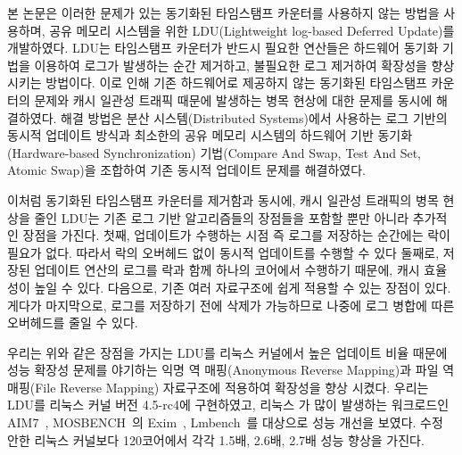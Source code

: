 %
본 논문은 이러한 문제가 있는 동기화된 타임스탬프 카운터를 사용하지 않는 방법을 사용하며,
공유 메모리 시스템을 위한 LDU(Lightweight log-based Deferred Update)를 개발하였다.
LDU는 타임스탬프 카운터가 반드시 필요한 연산들은 하드웨어 동기화 기법을 이용하여 
로그가 발생하는 순간 제거하고, 불필요한 로그 제거하여 확장성을 향상 시키는 방법이다.
이로 인해 기존 하드웨어로 제공하지 않는 동기화된 타임스탬프 카운터의 문제와 
캐시 일관성 트래픽 때문에 발생하는 병목 현상에 대한 문제를 동시에 해결하였다.
해결 방법은 분산 시스템(Distributed Systems)에서 사용하는 로그 기반의 
동시적 업데이트 방식과 최소한의 공유 메모리 시스템의 하드웨어 기반 동기화(Hardware-based
Synchronization) 기법(Compare And Swap, Test And Set, Atomic Swap)을 조합하여 기존 동시적
업데이트 문제를 해결하였다.

이처럼 동기화된 타임스탬프 카운터를 제거함과 동시에, 캐시 일관성 트래픽의 병목 현상을 줄인
LDU는 기존 로그 기반 알고리즘들의 장점들을 포함할 뿐만 아니라 추가적인 장점을 가진다.
첫째, 업데이트가 수행하는 시점 즉 로그를 저장하는 순간에는 락이 필요가 없다.
따라서 락의 오버헤드 없이 동시적 업데이트를 수행할 수 있다
둘째로, 저장된 업데이트 연산의 로그를 락과 함께 하나의 코어에서 수행하기 때문에, 
캐시 효율성이 높일 수 있다\cite{Hendler2010FC}.
다음으로, 기존 여러 자료구조에 쉽게 적용할 수 있는 장점이 있다.
게다가 마지막으로, 로그를 저장하기 전에 삭제가 가능하므로 나중에 로그 병합에 따른 오버헤드를 
줄일 수 있다. 

우리는 위와 같은 장점을 가지는 LDU를 리눅스 커널에서 높은 업데이트 비율 때문에 성능 확장성 
문제를 야기하는 익명 역 매핑(Anonymous Reverse Mapping)과 파일 역 매핑(File Reverse Mapping) 자료구조에
적용하여 확장성을 향상 시켰다.
우리는 LDU를 리눅스 커널 버전 4.5-rc4에 구현하였고, 리눅스 가 많이 발생하는 워크로드인
AIM7~\cite{AIM7Benchmark}, MOSBENCH~\cite{MOSBENCH}의 Exim~\cite{Exim}, Lmbench~\cite{mcvoy1996lmbench}를 
대상으로 성능 개선을 보였다.
수정 안한 리눅스 커널보다 120코어에서 각각 1.5배, 2.6배, 2.7배 성능 향상을 가진다.

